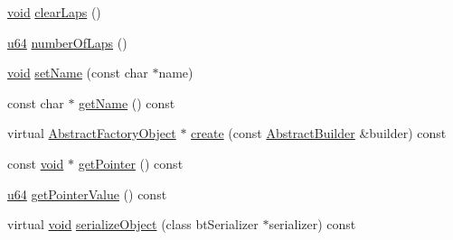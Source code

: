 \begin{DoxyCompactItemize}
\item 
\mbox{\hyperlink{_thread_8h_af1e856da2e658414cb2456cb6f7ebc66}{void}} \mbox{\hyperlink{classnjli_1_1_stop_watch_a190d183506dce6ce0497fd339e1891a8}{clear\+Laps}} ()
\item 
\mbox{\hyperlink{_util_8h_ad758b7a5c3f18ed79d2fcd23d9f16357}{u64}} \mbox{\hyperlink{classnjli_1_1_stop_watch_a4c1ef7d5831b366836689566ac084d69}{number\+Of\+Laps}} ()
\item 
\mbox{\hyperlink{_thread_8h_af1e856da2e658414cb2456cb6f7ebc66}{void}} \mbox{\hyperlink{classnjli_1_1_stop_watch_a087eb5f8d9f51cc476f12f1d10a3cb95}{set\+Name}} (const char $\ast$name)
\item 
const char $\ast$ \mbox{\hyperlink{classnjli_1_1_stop_watch_ad41266885be835f3ee602311e20877a4}{get\+Name}} () const
\item 
virtual \mbox{\hyperlink{classnjli_1_1_abstract_factory_object}{Abstract\+Factory\+Object}} $\ast$ \mbox{\hyperlink{classnjli_1_1_stop_watch_a83a8876ae63b92804004cf3febe76573}{create}} (const \mbox{\hyperlink{classnjli_1_1_abstract_builder}{Abstract\+Builder}} \&builder) const
\item 
const \mbox{\hyperlink{_thread_8h_af1e856da2e658414cb2456cb6f7ebc66}{void}} $\ast$ \mbox{\hyperlink{classnjli_1_1_stop_watch_ac4ca71716ed832be357f15f8262c8448}{get\+Pointer}} () const
\item 
\mbox{\hyperlink{_util_8h_ad758b7a5c3f18ed79d2fcd23d9f16357}{u64}} \mbox{\hyperlink{classnjli_1_1_stop_watch_a4ffddf141a426a5a07d0ac19f1913811}{get\+Pointer\+Value}} () const
\item 
virtual \mbox{\hyperlink{_thread_8h_af1e856da2e658414cb2456cb6f7ebc66}{void}} \mbox{\hyperlink{classnjli_1_1_stop_watch_a4fc4bcd9d1930911474210c047372fc0}{serialize\+Object}} (class bt\+Serializer $\ast$serializer) const
\end{DoxyCompactItemize}
